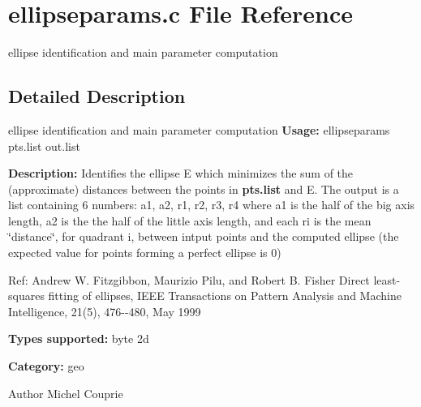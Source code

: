 \section{ellipseparams.c File Reference}
\label{ellipseparams_8c}


ellipse identification and main parameter computation  




\subsection{Detailed Description}
ellipse identification and main parameter computation {\bfseries Usage:} ellipseparams pts.list out.list

{\bfseries Description:} Identifies the ellipse E which minimizes the sum of the (approximate) distances between the points in {\bfseries pts.list} and E. The output is a list containing 6 numbers: a1, a2, r1, r2, r3, r4 where a1 is the half of the big axis length, a2 is the the half of the little axis length, and each ri is the mean \char`\"{}distance\char`\"{}, for quadrant i, between intput points and the computed ellipse (the expected value for points forming a perfect ellipse is 0)

Ref: Andrew W. Fitzgibbon, Maurizio Pilu, and Robert B. Fisher Direct least-\/squares fitting of ellipses, IEEE Transactions on Pattern Analysis and Machine Intelligence, 21(5), 476-\/-\/480, May 1999

{\bfseries Types supported:} byte 2d

{\bfseries Category:} geo

\begin{DoxyAuthor}{Author}
Michel Couprie 
\end{DoxyAuthor}
